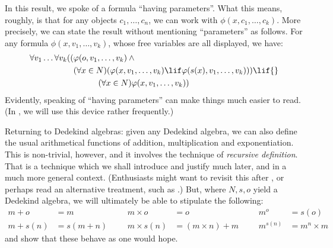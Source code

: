 \documentclass[../../../include/open-logic-section]{subfiles}
\begin{document}
In this result, we spoke of a formula ``having parameters''. What this
means, roughly, is that for any objects $c_1, \ldots, c_n$, we can
work with $\phi(x, c_1, \ldots, c_k)$. More precisely, we can state
the result without mentioning ``parameters'' as follows. For any
formula $\phi(x, v_1, \ldots, v_k)$, whose free variables are all
displayed, we have:
	\begin{align*}
			\forall v_1 \ldots \forall v_k((&\phi(o, v_1,\ldots, v_k) \land {}\\
			&	(\forall x \in N)(\phi(x,v_1, \ldots, v_k) \lif \phi(s(x), v_1,\ldots, v_k))) \lif {}\\
			&\hspace{3em} (\forall x \in N)\phi(x, v_1,\ldots, v_k))
	\end{align*}
Evidently, speaking of ``having parameters'' can make things much
easier to read. (In , we will use this device
rather frequently.)

Returning to Dedekind algebras: given any Dedekind algebra, we can
also define the usual arithmetical functions of addition,
multiplication and exponentiation. This is non-trivial, however, and
it involves the technique of \emph{recursive definition}. That is a
technique which we shall introduce and justify much later, and in a
much more general context. (Enthusiasts might want to revisit this
after , or perhaps read an alternative
treatment, such as \citealt[pp.~95--8]{Potter2004}.) But, where $N, s, o$
yield a Dedekind algebra, we will ultimately be able to stipulate the
following:
\begin{align*}
	{m} + {o} &= {m} & & & {m} \times {o} &= {o} & & & {m}^{o} &= s(o)\\
{m} + {s}({n}) &= {s}({m}+{n}) &&& {m} \times {s}({n}) &= ({m}\times {n}) + {m}  & & & {m}^{{s}({n})} &= {m}^{n} \times {m}
\end{align*}
and show that these behave as one would hope.
\end{document}
